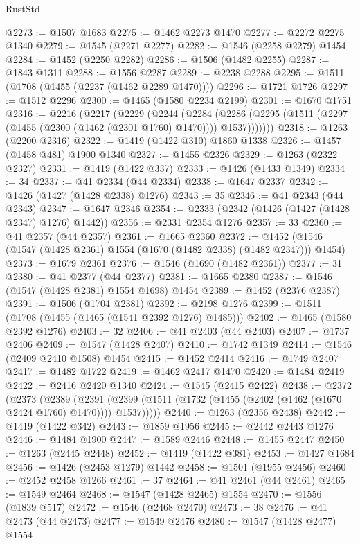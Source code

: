 \begin{lexlean}{RustStd}
\begin{coremodule}
@2273 := @1507 @1683
@2275 := @1462 @2273 @1470
@2277 := @2272 @2275 @1340
@2279 := @1545 (@2271 @2277)
@2282 := @1546 (@2258 @2279) @1454
@2284 := @1452 (@2250 @2282)
@2286 := @1506 (@1482 @2255)
@2287 := @1843 @1311
@2288 := @1556 @2287
@2289 := @2238 @2288
@2295 := @1511 (@1708 (@1455 (@2237 (@1462 @2289 @1470))))
@2296 := @1721 @1726
@2297 := @1512 @2296
@2300 := @1465 (@1580 @2234 @2199)
@2301 := @1670 @1751
@2316 := @2216
    (@2217
      (@2229
        (@2244
          (@2284
            (@2286 (@2295 (@1511 (@2297 (@1455 (@2300 (@1462 (@2301 @1760) @1470)))) @1537)))))))
@2318 := @1263 (@2200 @2316)
@2322 := @1419 (@1422 @310) @1860 @1338
@2326 := @1457 (@1458 @481) @1900 @1340
@2327 := @1455 @2326
@2329 := @1263 (@2322 @2327)
@2331 := @1419 (@1422 @337)
@2333 := @1426 (@1433 @1349)
@2334 := 34
@2337 := @41 @2334 (@44 @2334)
@2338 := @1647 @2337
@2342 := @1426 (@1427 (@1428 @2338) @1276)
@2343 := 35
@2346 := @41 @2343 (@44 @2343)
@2347 := @1647 @2346
@2354 := @2333 (@2342 (@1426 (@1427 (@1428 @2347) @1276) @1442))
@2356 := @2331 @2354 @1276
@2357 := 33
@2360 := @41 @2357 (@44 @2357)
@2361 := @1665 @2360
@2372 := @1452 (@1546 (@1547 (@1428 @2361) @1554 (@1670 (@1482 @2338) (@1482 @2347))) @1454)
@2373 := @1679 @2361
@2376 := @1546 (@1690 (@1482 @2361))
@2377 := 31
@2380 := @41 @2377 (@44 @2377)
@2381 := @1665 @2380
@2387 := @1546 (@1547 (@1428 @2381) @1554 @1698) @1454
@2389 := @1452 (@2376 @2387)
@2391 := @1506 (@1704 @2381)
@2392 := @2198 @1276
@2399 := @1511 (@1708 (@1455 (@1465 (@1541 @2392 @1276) @1485)))
@2402 := @1465 (@1580 @2392 @1276)
@2403 := 32
@2406 := @41 @2403 (@44 @2403)
@2407 := @1737 @2406
@2409 := @1547 (@1428 @2407)
@2410 := @1742 @1349
@2414 := @1546 (@2409 @2410 @1508) @1454
@2415 := @1452 @2414
@2416 := @1749 @2407
@2417 := @1482 @1722
@2419 := @1462 @2417 @1470
@2420 := @1484 @2419
@2422 := @2416 @2420 @1340
@2424 := @1545 (@2415 @2422)
@2438 := @2372
    (@2373
      (@2389
        (@2391 (@2399 (@1511 (@1732 (@1455 (@2402 (@1462 (@1670 @2424 @1760) @1470)))) @1537)))))
@2440 := @1263 (@2356 @2438)
@2442 := @1419 (@1422 @342)
@2443 := @1859 @1956
@2445 := @2442 @2443 @1276
@2446 := @1484 @1900
@2447 := @1589 @2446
@2448 := @1455 @2447
@2450 := @1263 (@2445 @2448)
@2452 := @1419 (@1422 @381)
@2453 := @1427 @1684
@2456 := @1426 (@2453 @1279) @1442
@2458 := @1501 (@1955 @2456)
@2460 := @2452 @2458 @1266
@2461 := 37
@2464 := @41 @2461 (@44 @2461)
@2465 := @1549 @2464
@2468 := @1547 (@1428 @2465) @1554
@2470 := @1556 (@1839 @517)
@2472 := @1546 (@2468 @2470)
@2473 := 38
@2476 := @41 @2473 (@44 @2473)
@2477 := @1549 @2476
@2480 := @1547 (@1428 @2477) @1554

\end{coremodule}
\end{lexlean}
